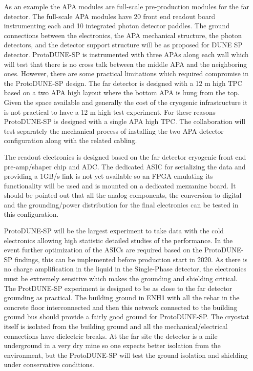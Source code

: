 As an example the APA modules are full-scale pre-production modules for the far detector. The full-scale APA modules have 20 front end readout board instrumenting each and 10 integrated photon detector paddles. The ground connections between the electronics, the APA mechanical structure, the photon detectors, and the detector support structure will be as proposed for DUNE SP detector. ProtoDUNE-SP is instrumented with three APAs along each wall which will test that there is no cross talk between the middle APA and the neighboring ones. However, there are some practical limitations which required compromise in the ProtoDUNE-SP design. The far detector is designed with a 12 m high TPC based on a two APA high layout where the bottom APA is hung from the top. Given the space available and generally the cost of the cryogenic infrastructure it is not practical to have a 12 m high test experiment. For these reasons ProtoDUNE-SP is designed with a single APA high TPC. The collaboration will test separately the mechanical process of installing the two APA detector configuration along with the related cabling.

The readout electronics is designed based on the far detector cryogenic front end pre-amp/shaper chip and ADC.  The dedicated ASIC for serializing the data and providing a 1GB/s link is not yet available so an FPGA emulating its functionality will be used and is mounted on a dedicated mezzanine board. It should be pointed out that all the analog components, the conversion to digital and the grounding/power distribution for the final electronics can be tested in this configuration. 

ProtoDUNE-SP will be the largest experiment to take data with the cold electronics allowing high statistic detailed studies of the performance. In the event further optimization of the ASICs are required based on the ProtoDUNE-SP findings, this can be implemented before production start in 2020. As there is no charge amplification in the liquid in the Single-Phase detector, the electronics must be extremely sensitive which makes the grounding and shielding critical. The ProtDUNE-SP experiment is designed to be as close to the far detector grounding as practical. The building ground in ENH1 with all the rebar in the concrete floor interconnected and then this network connected to the building ground bus should provide a fairly good ground for ProtoDUNE-SP. The cryostat itself is isolated from the building ground and all the mechanical/electrical connections have dielectric breaks. At the far site the detector is a mile underground in a very dry mine so one expects better isolation from the environment, but the ProtoDUNE-SP will test the ground isolation and shielding under conservative conditions.

